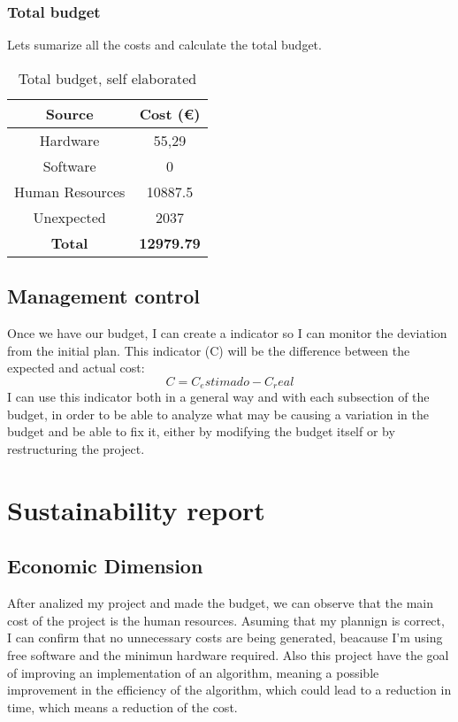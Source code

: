 \subsection*{Total budget}
Lets sumarize all the costs and calculate the total budget.
\begin{table}[H]
    \begin{adjustwidth}{-1in}{-1in} %
    \centering
    \begin{tabular}{|c|c|}
    \hline
    \textbf{Source} & \textbf{Cost (€)} \\ 
    \hline
    Hardware &  55,29 \\
    \hline
    Software & 0 \\
    \hline
    Human Resources & 10887.5 \\
    \hline
    Unexpected & 2037 \\
    \hline
    \hline
    \textbf{Total} & \textbf{12979.79}  \\
    \hline
    \end{tabular}
    \caption{Total budget, self elaborated}
    \label{total_budget}
    \end{adjustwidth}
    \end{table}
\section{Management control}
Once we have our budget, I can create a indicator so I can monitor the deviation from the initial plan.
This indicator (C) will be the difference between the expected and actual cost:
$$
C = C_estimado - C_real
$$ 
I can use this indicator both in a general way and with each subsection of the budget, in order to be able to analyze what may be causing a variation in the budget and be able to fix it, either by modifying the budget itself or by restructuring the project.
\chapter{Sustainability report}
\section{Economic Dimension}
After analized my project and made the budget, we can observe that the main cost of the project is the human resources.
Asuming that my plannign is correct, I can confirm that no unnecessary costs are being generated, beacause I'm using free software and the minimun hardware required.
Also this project have the goal of improving an implementation of an algorithm, meaning a possible improvement in the efficiency of the algorithm, which could lead to a reduction in time, which means a reduction of the cost.
